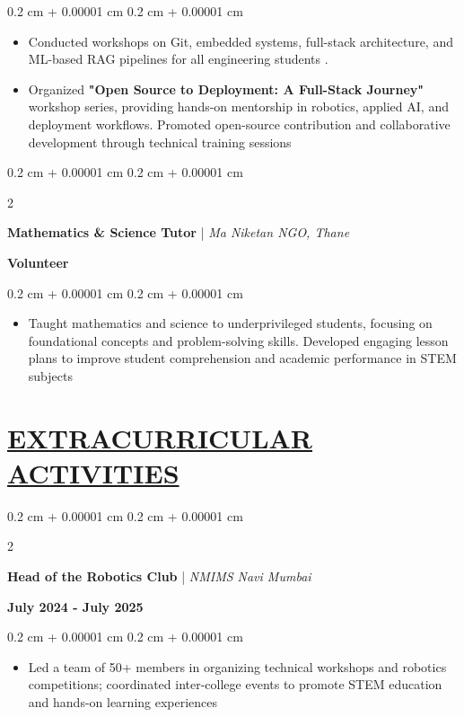 \documentclass[10pt, letterpaper]{article}
\newenvironment{highlights}{
    \begin{itemize}[
        topsep=0.05 cm,
        parsep=0 cm,
        partopsep=0pt,
        itemsep=0pt,
        leftmargin=0.4 cm + 10pt
    ]
}{
    \end{itemize}
} %
\newenvironment{onecolentry}{
    \begin{adjustwidth}{
        0.2 cm + 0.00001 cm
    }{
        0.2 cm + 0.00001 cm
    }
}{
    \end{adjustwidth}
} %
\newenvironment{twocolentry}[2][]{
    \onecolentry
    \def\secondColumn{#2}
    \setcolumnwidth{\fill, 5.0 cm}
    \begin{paracol}{2}
}{
    \switchcolumn \raggedleft \secondColumn
    \end{paracol}
    \endonecolentry
} %
\begin{document}
\vspace{0.10 cm}
\begin{onecolentry}
    \begin{highlights}
        \item Conducted workshops on Git, embedded systems, full-stack architecture, and ML-based RAG pipelines for all engineering students .
        \item Organized \textbf{"Open Source to Deployment: A Full-Stack Journey"} workshop series, providing hands-on mentorship in robotics, applied AI, and deployment workflows. Promoted open-source contribution and collaborative development through technical training sessions
    \end{highlights}
\end{onecolentry}

\vspace{0.2 cm}

\begin{twocolentry}{
    \textbf{Volunteer}}
    \textbf{Mathematics \& Science Tutor} | \textit{Ma Niketan NGO, Thane}
\end{twocolentry}

\vspace{0.10 cm}
\begin{onecolentry}
    \begin{highlights}
        \item Taught mathematics and science to underprivileged students, focusing on foundational concepts and problem-solving skills. Developed engaging lesson plans to improve student comprehension and academic performance in STEM subjects
    \end{highlights}
\end{onecolentry}






    \section{\href{https://www.harjot.info/\#Education}{EXTRACURRICULAR ACTIVITIES}}

\begin{twocolentry}{
    
    \textbf{July 2024 - July 2025}}
    \textbf{Head of the Robotics Club} | \textit{NMIMS Navi Mumbai}
\end{twocolentry}

\vspace{0.10 cm}
\begin{onecolentry}
    \begin{highlights}
        \item Led a team of 50+ members in organizing technical workshops and robotics competitions; coordinated inter-college events to promote STEM education and hands-on learning experiences
    \end{highlights}
\end{onecolentry}
\end{document}

